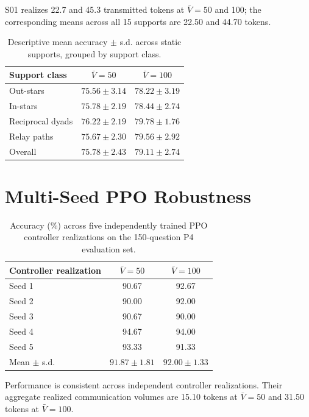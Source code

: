 \documentclass[11pt]{article}
\begin{document}
S01 realizes 22.7 and 45.3 transmitted tokens at $\bar V=50$ and 100; the
corresponding means across all 15 supports are 22.50 and 44.70 tokens.

\begin{table}[H]
\centering
\small
\setlength{\tabcolsep}{4pt}
\begin{tabular}{lcc}
\toprule
Support class & $\bar V=50$ & $\bar V=100$ \\
\midrule
Out-stars       & $75.56\pm3.14$ & $78.22\pm3.19$ \\
In-stars        & $75.78\pm2.19$ & $78.44\pm2.74$ \\
Reciprocal dyads& $76.22\pm2.19$ & $79.78\pm1.76$ \\
Relay paths     & $75.67\pm2.30$ & $79.56\pm2.92$ \\
\midrule
Overall         & $75.78\pm2.43$ & $79.11\pm2.74$ \\
\bottomrule
\end{tabular}
\caption{Descriptive mean accuracy $\pm$ s.d. across static supports, grouped
by support class.}
\label{tab:supportclasses}
\end{table}

\section{Multi-Seed PPO Robustness}
\label{app:multiseed}

\begin{table}[H]
\centering
\small
\setlength{\tabcolsep}{5pt}
\begin{tabular}{lcc}
\toprule
Controller realization & $\bar V=50$ & $\bar V=100$ \\
\midrule
Seed 1 & 90.67 & 92.67 \\
Seed 2 & 90.00 & 92.00 \\
Seed 3 & 90.67 & 90.00 \\
Seed 4 & 94.67 & 94.00 \\
Seed 5 & 93.33 & 91.33 \\
\midrule
Mean $\pm$ s.d. & $91.87\pm1.81$ & $92.00\pm1.33$ \\
\bottomrule
\end{tabular}
\caption{Accuracy (\%) across five independently trained PPO controller
realizations on the 150-question P4 evaluation set.}
\label{tab:multiseed}
\end{table}

Performance is consistent across independent controller realizations. Their
aggregate realized communication volumes are 15.10 tokens at $\bar V=50$ and
31.50 tokens at $\bar V=100$.
\end{document}
